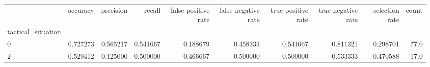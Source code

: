 \begin{tabular}{lrrrrrrrrr}
\toprule
{} &  accuracy &  precision &    recall &  false positive rate &  false negative rate &  true positive rate &  true negative rate &  selection rate &  count \\
tactical\_situation &           &            &           &                      &                      &                     &                     &                 &        \\
\midrule
0                  &  0.727273 &   0.565217 &  0.541667 &             0.188679 &             0.458333 &            0.541667 &            0.811321 &        0.298701 &   77.0 \\
2                  &  0.529412 &   0.125000 &  0.500000 &             0.466667 &             0.500000 &            0.500000 &            0.533333 &        0.470588 &   17.0 \\
\bottomrule
\end{tabular}

